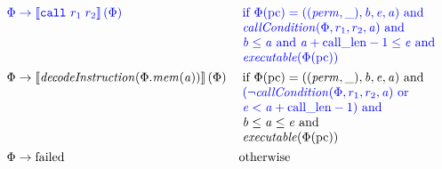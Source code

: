 \documentclass[a3paper]{article}
\newcommand{\sem}[1]{\left\llbracket #1 \right\rrbracket}
\newcommand{\tand}{\text{ and }}
\newcommand{\tor}{\text{ or }}
\newcommand{\totherwise}{\text{otherwise }}
\newcommand{\sourcecolor}{\color{blue}}
\newcommand{\src}[1]{{\sourcecolor #1}}
\newcommand{\zinstr}[1]{\texttt{#1}}
\newcommand{\scall}[3][]{  
\ifthenelse{\equal{#2#3}{}}
  {\ensuremath{\zinstr{\src{call}}_{#1}}}
  {\ensuremath{\zinstr{\src{call}}_{#1} \; #2 \; #3}}
}
\newcommand{\perm}{\var{perm}}
\newcommand{\failed}{\mathrm{failed}}
\newcommand{\step}{\rightarrow}
\newcommand{\var}[1]{\mathit{#1}}
\newcommand{\mem}{\var{mem}}
\newcommand{\baddr}{\var{b}}
\newcommand{\eaddr}{\var{e}}
\newcommand{\aaddr}{\var{a}}
\newcommand{\constant}[1]{\mathrm{#1}}
\newcommand{\calllen}{\constant{call\_len}}
\newcommand{\pcreg}{\mathrm{pc}}
\newcommand{\plainfun}[2]{
  \ifthenelse{\equal{#2}{}}
  {\mathit{#1}}
  {\mathit{#1}(#2)}
}
\newcommand{\callCond}[1]{\plainfun{callCondition}{#1}}
\newcommand{\decInstr}[1]{\plainfun{decodeInstruction}{#1}}
\newcommand{\exec}[1]{\plainfun{executable}{#1}}
\begin{document}
\begin{align*}
  \src{\Phi} & \; \src{\step \sem{\scall{r_1}{r_2}}(\Phi)} &  &\sourcecolor\left.\arraycolsep=0pt
                                                  \begin{array}[t]{l}
                                                    \text{if }\Phi(\pcreg) = ((\perm,\_),\baddr,\eaddr,\aaddr) \tand \\
                                                    \callCond{\Phi,r_1,r_2,\aaddr} \tand\\
                                                    \baddr \leq \aaddr \tand \aaddr + \calllen-1 \leq \eaddr \tand \\
                                                    \exec{\Phi(\pcreg)}
                                                  \end{array}\right.\\
  \Phi & \step \sem{\decInstr{\Phi.\mem(\aaddr)}}(\Phi) & &\left.\arraycolsep=0pt
                                                  \begin{array}[t]{l}
                                                    \text{if }\Phi(\pcreg) = ((\perm,\_),\baddr,\eaddr,\aaddr) \tand \\
                                                    \src{(\neg\callCond{\Phi,r_1,r_2,\aaddr} \tor}\\
                                                    \src{\eaddr < \aaddr + \calllen-1) \tand} \\
                                                    \baddr \leq \aaddr \leq \eaddr\tand\\
                                                    \exec{\Phi(\pcreg)}
                                                  \end{array}\right.\\
  \Phi& \step \failed & & \totherwise
\end{align*}
\end{document}
